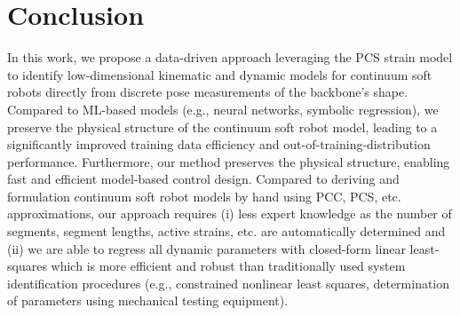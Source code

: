 
\section{Conclusion}
In this work, we propose a data-driven approach leveraging the \gls{PCS} strain model to identify low-dimensional kinematic and dynamic models for continuum soft robots directly from discrete pose measurements of the backbone's shape.
Compared to \gls{ML}-based models (e.g., neural networks, symbolic regression), we preserve the physical structure of the continuum soft robot model, leading to a significantly improved training data efficiency and out-of-training-distribution performance.
Furthermore, our method preserves the physical structure, enabling fast and efficient model-based control design.
Compared to deriving and formulation continuum soft robot models by hand using \gls{PCC}, \gls{PCS}, etc. approximations, our approach requires (i) less expert knowledge as the number of segments, segment lengths, active strains, etc. are automatically determined and (ii) we are able to regress all dynamic parameters with closed-form linear least-squares which is more efficient and robust than traditionally used system identification procedures (e.g., constrained nonlinear least squares, determination of parameters using mechanical testing equipment).

